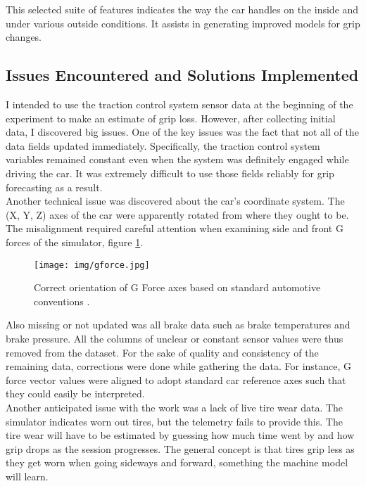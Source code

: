 \documentclass[a4paper,final,12pt]{report}
\begin{document}
\begin{itemize}
\end{itemize}

This selected suite of features indicates the way the car handles on the inside and under various outside conditions. It assists in generating improved models for grip changes.

\subsection{Issues Encountered and Solutions Implemented}
I intended to use the traction control system sensor data at the beginning of the experiment to make an estimate of grip loss. However, after collecting initial data, I discovered big issues. One of the key issues was the fact that not all of the data fields updated immediately. Specifically, the traction control system variables remained constant even when the system was definitely engaged while driving the car. It was extremely difficult to use those fields reliably for grip forecasting as a result.\\

Another technical issue was discovered about the car's coordinate system. The (X, Y, Z) axes of the car were apparently rotated from where they ought to be. The misalignment required careful attention when examining side and front G forces of the simulator, figure \ref{figura:gf}.

\begin{figure}[hbtp]
\centering
\texttt{[image: img/gforce.jpg]}
\caption{Correct orientation of G Force axes based on standard automotive conventions \cite{emtronaustralia2025}.}
\label{figura:gf}
\end{figure}

Also missing or not updated was all brake data such as brake temperatures and brake pressure. All the columns of unclear or constant sensor values were thus removed from the dataset. For the sake of quality and consistency of the remaining data, corrections were done while gathering the data. For instance, G force vector values were aligned to adopt standard car reference axes such that they could easily be interpreted.\\

Another anticipated issue with the work was a lack of live tire wear data. The simulator indicates worn out tires, but the telemetry fails to provide this. The tire wear will have to be estimated by guessing how much time went by and how grip drops as the session progresses. The general concept is that tires grip less as they get worn when going sideways and forward, something the machine model will learn.
\end{document}
